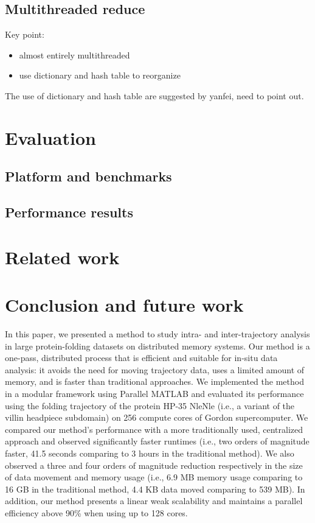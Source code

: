 \documentclass[10pt,conference,compsocconf]{IEEEtran}
\begin{document}
\subsection{Multithreaded reduce}

Key point:
\begin{itemize}
\item almost entirely multithreaded
\item use dictionary and hash table to reorganize 
\end{itemize}

The use of dictionary and hash table are suggested by yanfei, need to point out.








\section{Evaluation}
\label{s:evaluation}

\subsection{Platform and benchmarks}


\subsection{Performance results }





\section{Related work}
\label{s:related_work}

\section{Conclusion and future work}
\label{s:conclusions}

In this paper, we presented a method to study intra- and
inter-trajectory analysis in large protein-folding datasets on
distributed memory systems. Our method is a one-pass, distributed
process that is efficient and suitable for in-situ data analysis:
it avoids the need for moving trajectory data, uses a limited amount of 
memory, and is faster than traditional approaches.
We implemented the method in a modular framework using
Parallel MATLAB and evaluated its performance using the folding
trajectory of the protein HP-35 NleNle (i.e., a variant of the villin
headpiece subdomain) on 256 compute cores of Gordon supercomputer. 
We compared our method's performance with a more traditionally used,
centralized approach and observed significantly faster runtimes
(i.e., two orders of magnitude faster, 41.5 seconds comparing to 3
hours in the traditional method). We also observed a three and four
orders of magnitude reduction respectively in the size of data
movement and memory usage (i.e., 6.9 MB memory usage comparing to 16
GB in the traditional method, 4.4 KB data moved comparing to 539
MB). In addition, our method presents a linear weak scalability and
maintains a parallel efficiency above 90\% when using up to 128
cores. 
\end{document}
